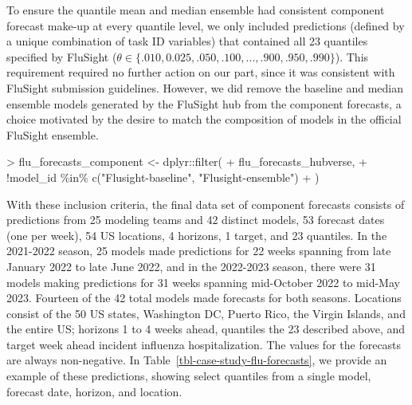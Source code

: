 \documentclass[
]{article}
\newenvironment{Shaded}{\begin{snugshade}}{\end{snugshade}}
\newcommand{\FunctionTok}[1]{\textcolor[rgb]{0.28,0.35,0.67}{#1}}
\newcommand{\NormalTok}[1]{\textcolor[rgb]{0.00,0.23,0.31}{#1}}
\newcommand{\OtherTok}[1]{\textcolor[rgb]{0.00,0.23,0.31}{#1}}
\newcommand{\SpecialCharTok}[1]{\textcolor[rgb]{0.37,0.37,0.37}{#1}}
\newcommand{\StringTok}[1]{\textcolor[rgb]{0.13,0.47,0.30}{#1}}
\begin{document}
To ensure the quantile mean and median ensemble had consistent component
forecast make-up at every quantile level, we only included predictions
(defined by a unique combination of task ID variables) that contained
all 23 quantiles specified by FluSight
(\(\theta \in \{.010, 0.025, .050, .100, ..., .900, .950, .990\}\)).
This requirement required no further action on our part, since it was
consistent with FluSight submission guidelines. However, we did remove
the baseline and median ensemble models generated by the FluSight hub
from the component forecasts, a choice motivated by the desire to match
the composition of models in the official FluSight ensemble.

\begin{Shaded}
\begin{Highlighting}[]
\SpecialCharTok{\textgreater{}}\NormalTok{ flu\_forecasts\_component }\OtherTok{\textless{}{-}}\NormalTok{ dplyr}\SpecialCharTok{::}\FunctionTok{filter}\NormalTok{(}
\SpecialCharTok{+}\NormalTok{   flu\_forecasts\_hubverse,}
\SpecialCharTok{+}   \SpecialCharTok{!}\NormalTok{model\_id }\SpecialCharTok{\%in\%} \FunctionTok{c}\NormalTok{(}\StringTok{"Flusight{-}baseline"}\NormalTok{, }\StringTok{"Flusight{-}ensemble"}\NormalTok{)}
\SpecialCharTok{+}\NormalTok{ )}
\end{Highlighting}
\end{Shaded}

With these inclusion criteria, the final data set of component forecasts
consists of predictions from 25 modeling teams and 42 distinct models,
53 forecast dates (one per week), 54 US locations, 4 horizons, 1 target,
and 23 quantiles. In the 2021-2022 season, 25 models made predictions
for 22 weeks spanning from late January 2022 to late June 2022, and in
the 2022-2023 season, there were 31 models making predictions for 31
weeks spanning mid-October 2022 to mid-May 2023. Fourteen of the 42
total models made forecasts for both seasons. Locations consist of the
50 US states, Washington DC, Puerto Rico, the Virgin Islands, and the
entire US; horizons 1 to 4 weeks ahead, quantiles the 23 described
above, and target week ahead incident influenza hospitalization. The
values for the forecasts are always non-negative. In
Table~\ref{tbl-case-study-flu-forecasts}, we provide an example of these
predictions, showing select quantiles from a single model, forecast
date, horizon, and location.
\end{document}
